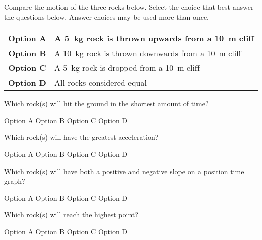 \documentclass[answers,dvipsnames]{exam}
\begin{document}
\begin{questions}
\begin{EnvUplevel}
    Compare the motion of the three rocks below. Select the choice that best answer the questions below. Answer choices may be used more than once.
\end{EnvUplevel}

\begin{center}
    \begin{tabular}{|c|l|}
        \hline 
        \textbf{Option A} & A \SI{5}{kg} rock is thrown upwards from a \SI{10}{m} cliff\\ \hline
        \textbf{Option B} & A \SI{10}{kg}  rock is thrown downwards from a \SI{10}{m} cliff\\ \hline
        \textbf{Option C} & A \SI{5}{kg} rock is dropped from a \SI{10}{m} cliff\\ \hline
        \textbf{Option D} &  All rocks considered equal\\ \hline
    \end{tabular}
\end{center}

\question
Which rock(s) will hit the ground in the shortest amount of time?

\begin{randomizechoices}[norandomize]
    \choice Option A
    \correctchoice Option B
    \choice Option C
    \choice Option D
\end{randomizechoices}

\question
Which rock(s) will have the greatest acceleration?

\begin{randomizechoices}[norandomize]
    \choice Option A
    \choice Option B
    \choice Option C
    \correctchoice Option D
\end{randomizechoices}


\question
Which rock(s) will have both a positive and negative slope on a position time graph?

\begin{randomizechoices}[norandomize]
    \correctchoice Option A
    \choice Option B
    \choice Option C
    \choice Option D
\end{randomizechoices}

\question
Which rock(s) will reach the highest point?

\begin{randomizechoices}[norandomize]
    \correctchoice Option A
    \choice Option B
    \choice Option C
    \choice Option D
\end{randomizechoices}



\end{questions}
\end{document}
